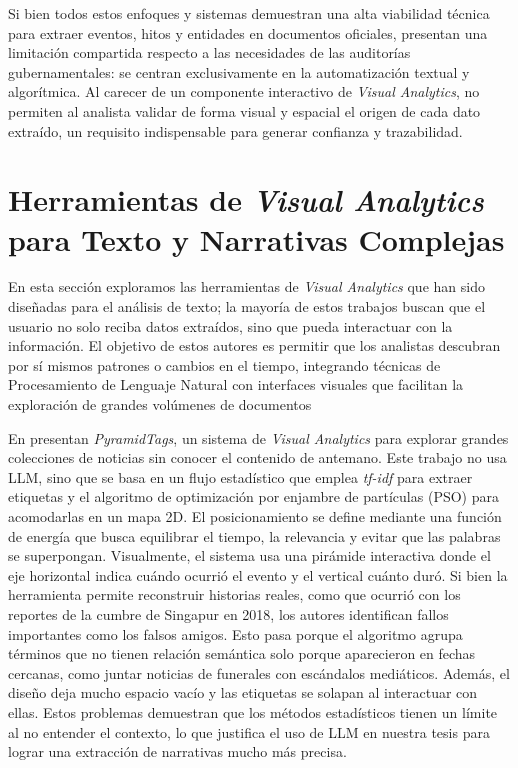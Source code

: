 Si bien todos estos enfoques y sistemas demuestran una alta viabilidad técnica para extraer eventos, hitos y entidades en documentos oficiales, presentan una limitación compartida respecto a las necesidades de las auditorías gubernamentales: se centran exclusivamente en la automatización textual y algorítmica. Al carecer de un componente interactivo de \textit{Visual Analytics}, no permiten al analista validar de forma visual y espacial el origen de cada dato extraído, un requisito indispensable para generar confianza y trazabilidad.









\section{Herramientas de \textit{Visual Analytics} para Texto y Narrativas Complejas}

En esta sección exploramos las herramientas de \textit{Visual Analytics} que han sido diseñadas para el análisis de texto; la mayoría de estos trabajos buscan que el usuario no solo reciba datos extraídos, sino que pueda interactuar con la información. El objetivo de estos autores es permitir que los analistas descubran por sí mismos patrones o cambios en el tiempo, integrando técnicas de Procesamiento de Lenguaje Natural con interfaces visuales que facilitan la exploración de grandes volúmenes de documentos






En \cite{knittel2021} presentan \textit{PyramidTags}, un sistema de \textit{Visual Analytics} para explorar grandes colecciones de noticias sin conocer el contenido de antemano. Este trabajo no usa \acs{LLM}, sino que se basa en un flujo estadístico que emplea \textit{tf-idf} para extraer etiquetas y el algoritmo de optimización por enjambre de partículas (\ac{PSO}) para acomodarlas en un mapa 2D. El posicionamiento se define mediante una función de energía que busca equilibrar el tiempo, la relevancia y evitar que las palabras se superpongan. Visualmente, el sistema usa una pirámide interactiva donde el eje horizontal indica cuándo ocurrió el evento y el vertical cuánto duró. Si bien la herramienta permite reconstruir historias reales, como que ocurrió con los reportes de la cumbre de Singapur en 2018, los autores identifican fallos importantes como los falsos amigos. Esto pasa porque el algoritmo agrupa términos que no tienen relación semántica solo porque aparecieron en fechas cercanas, como juntar noticias de funerales con escándalos mediáticos. Además, el diseño deja mucho espacio vacío y las etiquetas se solapan al interactuar con ellas. Estos problemas demuestran que los métodos estadísticos tienen un límite al no entender el contexto, lo que justifica el uso de \acs{LLM} en nuestra tesis para lograr una extracción de narrativas mucho más precisa.





